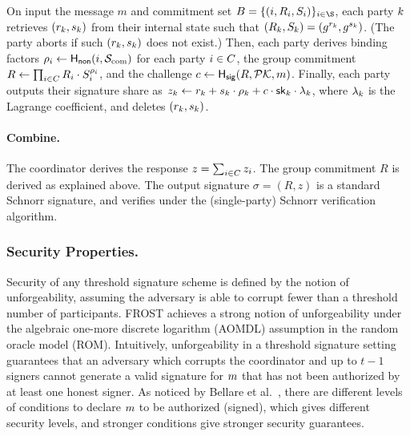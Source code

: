 On input the message $m$ and commitment set $B = \{ (i, R_i, S_i) \}_{i \in \S}$,
each party $k$ retrieves $(r_{k}, s_{k})$ from their internal state such that $(R_k, S_k) = (g^{r_{k}}, g^{s_{k}})$.
(The party aborts if such $(r_{k}, s_{k})$ does not exist.)
Then, each party derives binding factors $\rho_i \gets \mathsf{H_{non}}(i, \mathcal{S}_{\rm com})$ for each party $i \in C$, the group commitment $R \gets \prod_{i \in C} R_{i} \cdot  S_{i}^{\rho_i}$, and the challenge
$c \gets \mathsf{H_{sig}}(R, \mathcal{PK}, m)$.
Finally, each party outputs their signature share as
$z_k \gets r_{k} + s_{k} \cdot \rho_k + c \cdot \mathsf{sk}_k \cdot \lambda_k$,
where $\lambda_k$ is the Lagrange coefficient,
and deletes $(r_{k}, s_{k})$.


\paragraph{Combine.}
The coordinator derives the response $z = \sum_{i \in C} z_i$.
The group commitment $R$ is derived as explained above.
The output signature $\sigma = (R,z)$ is a standard Schnorr signature,
and verifies under the (single-party) Schnorr verification algorithm.

\subsubsection{Security Properties.}
Security of any threshold signature scheme is defined by the notion of unforgeability,
assuming the adversary is able to corrupt fewer than a threshold number of participants.
FROST achieves a strong notion of unforgeability under the algebraic one-more discrete logarithm (AOMDL) assumption in the random oracle model (ROM).
Intuitively, unforgeability in a threshold signature setting guarantees that an adversary which corrupts the coordinator and up to $t-1$ signers  cannot generate a valid signature  for $m$  that has not been authorized by at least one honest signer. 
As noticed  by Bellare et al.~\cite{BellareCKMTZ22}, there are different levels of conditions to declare $m$ to be authorized (signed), which gives different security levels, and stronger conditions give stronger security guarantees.

